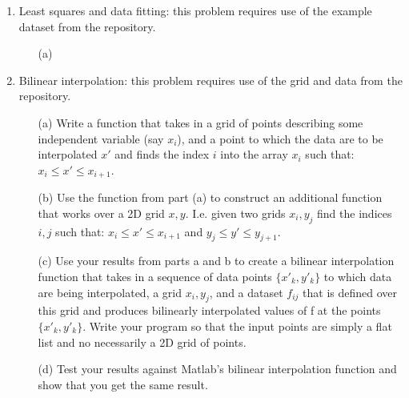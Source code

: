 \documentclass{article}
\begin{document}
\begin{enumerate}
  \item Least squares and data fitting:  this problem requires use of the example dataset from the repository.  
  \begin{itemize}
    \item[(a)]  
  \end{itemize}
  \item Bilinear interpolation:  this problem requires use of the grid and data from the repository.  
  \begin{itemize}
    \item[(a)]  Write a function that takes in a grid of points describing some independent variable (say $x_i$), and a point to which the data are to be interpolated $x'$ and finds the index $i$ into the array $x_i$ such that:  $x_i \le x' \le x_{i+1}$.  
    \item[(b)]  Use the function from part (a) to construct an additional function that works over a 2D grid $x,y$.  I.e. given two grids $x_i,y_j$ find the indices $i,j$ such that:  $x_i \le x' \le x_{i+1}$ and $y_j \le y' \le y_{j+1}$.
    \item[(c)]  Use your results from parts a and b to create a bilinear interpolation function that takes in a sequence of data points $\{x'_k,y'_k\}$ to which data are being interpolated, a grid $x_i,y_j$, and a dataset $f_{ij}$ that is defined over this grid and produces bilinearly interpolated values of f at the points $\{x'_k,y'_k\}$.  Write your program so that the input points are simply a flat list and no necessarily a 2D grid of points.  
    \item[(d)]  Test your results against Matlab's bilinear interpolation function and show that you get the same result.  
  \end{itemize} 
\end{enumerate}
\end{document}
